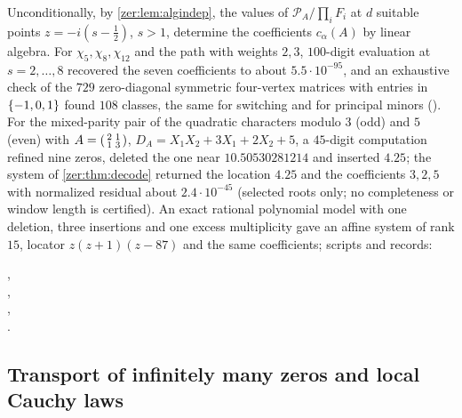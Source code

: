 \begin{remark}\label{zer:rem:decode}
Unconditionally, by \cref{zer:lem:algindep}, the values of $\mathcal P_A/\prod_iF_i$ at $d$ suitable points
$z=-i(s-\tfrac12)$, $s>1$, determine the coefficients $c_\alpha(A)$ by linear algebra. For
$\chi_5,\chi_8,\chi_{12}$ and the path with weights $2,3$, $100$-digit evaluation at $s=2,\dots,8$ recovered
the seven coefficients to about $5.5\cdot10^{-95}$, and an exhaustive check of the $729$ zero-diagonal
symmetric four-vertex matrices with entries in $\{-1,0,1\}$ found $108$ classes, the same for switching
and for principal minors (). For the mixed-parity pair of
the quadratic characters modulo $3$ (odd) and $5$ (even) with $A=\begin{psmallmatrix}2&1\\1&3\end{psmallmatrix}$,
$D_A=X_1X_2+3X_1+2X_2+5$, a $45$-digit computation refined nine zeros, deleted the one near
$10.50530281214$ and inserted $4.25$; the system of \cref{zer:thm:decode} returned the location $4.25$ and the
coefficients $3,2,5$ with normalized residual about $2.4\cdot10^{-45}$ (selected roots only; no completeness
or window length is certified). An exact rational polynomial model with one deletion, three insertions and
one excess multiplicity gave an affine system of rank $15$, locator $z(z+1)(z-87)$ and the same coefficients; scripts and records:
\begin{center},\\
,\\
,\\
.\end{center}
\end{remark}




\subsection{Transport of infinitely many zeros and local Cauchy laws}\label{zer:sec:transport}

